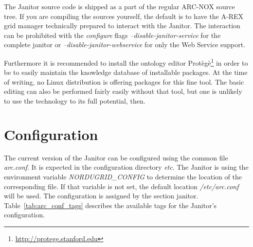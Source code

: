 The Janitor source code is shipped as a part of the regular ARC-NOX
source tree.  If you are compiling the sources yourself, the default
is to have the A-REX grid manager technically prepared to interact
with the Janitor.
The interaction can be prohibited
with the \textit{configure} flags \textit{--disable-janitor-service}
for the complete janitor or \textit{--disable-janitor-webservice} for
only the Web Service support.

Furthermore it is recommended to install the ontology editor 
Prot\`eg\`e\footnote{\href{http://protege.stanford.edu}{http://protege.stanford.edu}}
in order to be to easily maintain the knowledge database of installable
packages.  At the time of writing, no Linux distribution is offering
packages for this fine tool. The basic editing can also be performed
fairly easily without that tool, but one is unlikely to use the technology
to its full potential, then.


\section{Configuration}\label{sec:janitor_configuration}

The current version of the Janitor can be configured using the
common file \textit{arc.conf}. It is expected in the configuration
directory \textit{etc}. The Janitor is using the environment
variable \textit{NORDUGRID\_CONFIG} to determine the location of the
corresponding file. If that variable is not set, the default location
\textit{/etc/arc.conf} will be used.  The configuration is assigned
by the section \lbrack janitor\rbrack. Table~\ref{tab:arc_conf_tags}
describes the available tags for the Janitor's configuration.

